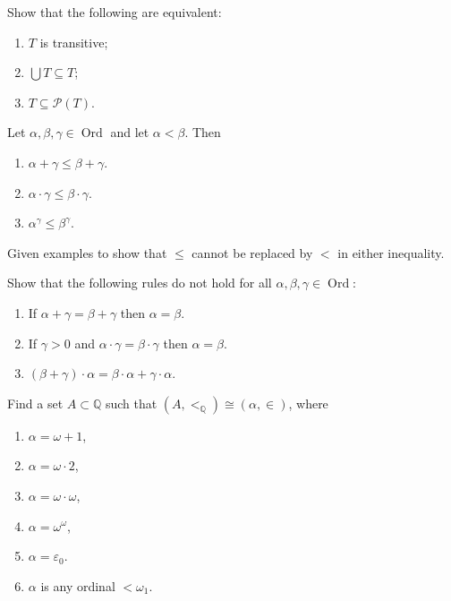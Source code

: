 \documentclass{ctexart}
\DeclareMathOperator{\ord}{Ord}
\begin{document}
\begin{problem}
Show that the following are equivalent:
\begin{enumerate}[ref=\theproblem.\arabic*]
\item\label{it:1} $T$ is transitive;
\item\label{it:2}$\bigcup T \subseteq T$;
\item\label{it:3} $T \subseteq \mathscr{P}(T)$.
\end{enumerate}
\end{problem}



\begin{problem}
Let $\alpha, \beta, \gamma \in\ord$ and let $\alpha<\beta$. Then
\begin{enumerate}[label=\alph*,ref=\theproblem.\alph*]
\item\label{it:11} $\alpha+\gamma \leq \beta+\gamma$.
\item\label{it:12} $\alpha \cdot \gamma \leq \beta \cdot \gamma$.
\item\label{it:13} $\alpha^\gamma \leq \beta^\gamma$.
\end{enumerate}
Given examples to show that $\leq$ cannot be replaced by $<$ in either inequality.
\end{problem}




\begin{problem}
Show that the following rules do not hold for all $\alpha, \beta, \gamma \in\ord$:
\begin{enumerate}[label=\alph*,ref=\theproblem.\alph*]
\item If $\alpha+\gamma=\beta+\gamma$ then $\alpha=\beta$.
\item If $\gamma>0$ and $\alpha \cdot \gamma=\beta \cdot \gamma$ then $\alpha=\beta$.
\item $(\beta+\gamma) \cdot \alpha=\beta \cdot \alpha+\gamma \cdot \alpha$.
\end{enumerate}
\end{problem}



\begin{problem}
Find a set $A \subset \mathbb{Q}$ such that $\left(A,<_{\mathbb{Q}}\right) \cong(\alpha, \in)$, where
\begin{enumerate}[label=\alph*,ref=\theproblem.\alph*]
\item  $\alpha=\omega+1$,
\item  $\alpha=\omega \cdot 2$,
\item  $\alpha=\omega \cdot \omega$,
\item  $\alpha=\omega^\omega$,
\item  $\alpha=\varepsilon_0$.
\item  $\alpha$ is any ordinal $<\omega_1$.
\end{enumerate}
\end{problem}
\end{document}
